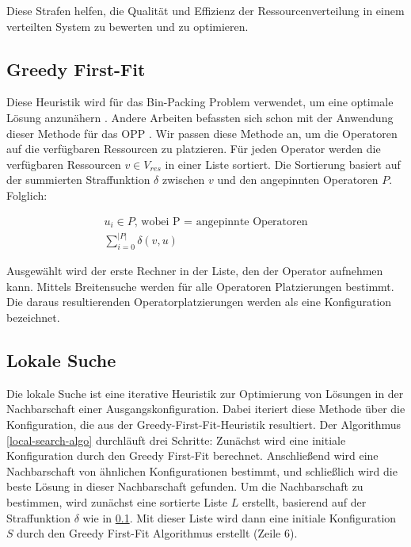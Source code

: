 \documentclass{article}
\begin{document}
Diese Strafen helfen, die Qualität und Effizienz der Ressourcenverteilung in einem verteilten System zu bewerten und zu optimieren.




\subsection{Greedy First-Fit} \label{greedy-first-fit}
Diese Heuristik wird für das Bin-Packing Problem verwendet, um eine optimale Lösung anzunähern \cite{greedy-first-fit}. 
Andere Arbeiten befassten sich schon  mit der Anwendung dieser Methode für das OPP \cite{k7, k8}.
Wir passen diese Methode an, um die Operatoren auf die verfügbaren Ressourcen zu platzieren. 
Für jeden Operator werden die verfügbaren Ressourcen $v \in V_{res}$ in einer Liste sortiert. Die Sortierung basiert auf der summierten Straffunktion $\delta$
zwischen $v$ und den angepinnten Operatoren $P$. Folglich:

\[ 
    \begin{gathered}
        u_i \in P \text{, wobei P = angepinnte Operatoren} \\
        \sum_{i=0}^{|P|} \delta(v, u)
    \end{gathered} 
\] 

Ausgewählt wird der erste Rechner in der Liste, den der Operator aufnehmen kann. Mittels Breitensuche werden für alle Operatoren Platzierungen bestimmt. 
Die daraus resultierenden Operatorplatzierungen werden als eine Konfiguration bezeichnet.



\newpage
\subsection{Lokale Suche} \label{local-search}
Die lokale Suche ist eine iterative Heuristik zur Optimierung von Lösungen in der Nachbarschaft einer Ausgangskonfiguration. 
Dabei iteriert diese Methode über die Konfiguration, die aus der Greedy-First-Fit-Heuristik resultiert. 
Der Algorithmus \ref{local-search-algo} durchläuft drei Schritte: 
Zunächst wird eine initiale Konfiguration durch den Greedy First-Fit berechnet. 
Anschließend wird eine Nachbarschaft von ähnlichen Konfigurationen bestimmt, und schließlich wird die beste Lösung in dieser Nachbarschaft gefunden.
Um die Nachbarschaft zu bestimmen, wird zunächst eine sortierte Liste $L$ erstellt, basierend auf der Straffunktion $\delta$ wie in \ref{greedy-first-fit}.
Mit dieser Liste wird dann eine initiale Konfiguration $S$ durch den Greedy First-Fit Algorithmus erstellt (Zeile 6). \\
\end{document}
